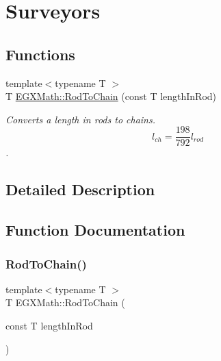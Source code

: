 \hypertarget{group___e_g_x_math-_conversions-_length_conversions-_imperial-_rod-_surveyors}{}\section{Surveyors}
\label{group___e_g_x_math-_conversions-_length_conversions-_imperial-_rod-_surveyors}
\subsection*{Functions}
\begin{DoxyCompactItemize}
\item 
{\footnotesize template$<$typename T $>$ }\\T \mbox{\hyperlink{group___e_g_x_math-_conversions-_length_conversions-_imperial-_rod-_surveyors_gaac83cacda4ed47a99bd5c2a04d33df49}{E\+G\+X\+Math\+::\+Rod\+To\+Chain}} (const T length\+In\+Rod)
\begin{DoxyCompactList}\small\item\em Converts a length in rods to chains. \[ l_{ch}= \frac{198}{792} l_{rod} \]. \end{DoxyCompactList}\end{DoxyCompactItemize}


\subsection{Detailed Description}


\subsection{Function Documentation}
\mbox{\label{group___e_g_x_math-_conversions-_length_conversions-_imperial-_rod-_surveyors_gaac83cacda4ed47a99bd5c2a04d33df49}} 
\subsubsection{\texorpdfstring{Rod\+To\+Chain()}{RodToChain()}}
{\footnotesize\ttfamily template$<$typename T $>$ \\
T E\+G\+X\+Math\+::\+Rod\+To\+Chain (\begin{DoxyParamCaption}\item[{const T}]{length\+In\+Rod }\end{DoxyParamCaption})}



